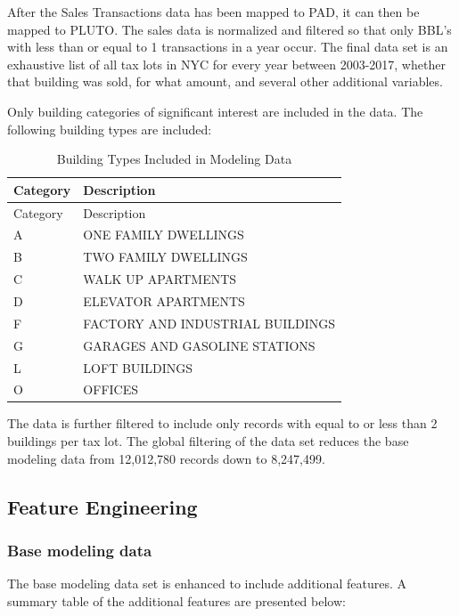 \documentclass[12pt,]{article}
\begin{document}
After the Sales Transactions data has been mapped to PAD, it can then be
mapped to PLUTO. The sales data is normalized and filtered so that only
BBL's with less than or equal to 1 transactions in a year occur. The
final data set is an exhaustive list of all tax lots in NYC for every
year between 2003-2017, whether that building was sold, for what amount,
and several other additional variables.

Only building categories of significant interest are included in the
data. The following building types are included:

\begin{longtable}[]{@{}ll@{}}
\caption{Building Types Included in Modeling Data}\tabularnewline
\toprule
Category & Description\tabularnewline
\midrule
\endfirsthead
\toprule
Category & Description\tabularnewline
\midrule
\endhead
A & ONE FAMILY DWELLINGS\tabularnewline
B & TWO FAMILY DWELLINGS\tabularnewline
C & WALK UP APARTMENTS\tabularnewline
D & ELEVATOR APARTMENTS\tabularnewline
F & FACTORY AND INDUSTRIAL BUILDINGS\tabularnewline
G & GARAGES AND GASOLINE STATIONS\tabularnewline
L & LOFT BUILDINGS\tabularnewline
O & OFFICES\tabularnewline
\bottomrule
\end{longtable}

The data is further filtered to include only records with equal to or
less than 2 buildings per tax lot. The global filtering of the data set
reduces the base modeling data from 12,012,780 records down to
8,247,499.

\subsection{Feature Engineering}\label{feature-engineering}

\subsubsection{Base modeling data}\label{base-modeling-data}

The base modeling data set is enhanced to include additional features. A
summary table of the additional features are presented below:
\end{document}
